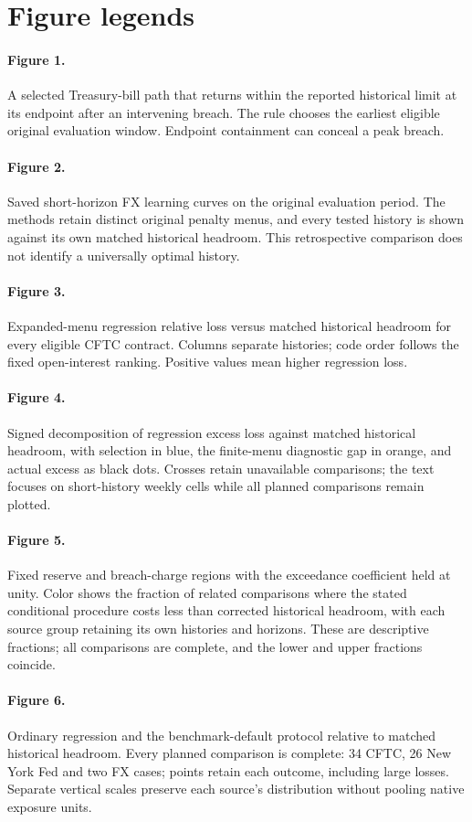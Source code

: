 \section*{Figure legends}
\paragraph{Figure 1.} A selected Treasury-bill path that returns within the reported historical limit at its endpoint after an intervening breach. The rule chooses the earliest eligible original evaluation window. Endpoint containment can conceal a peak breach.

\paragraph{Figure 2.} Saved short-horizon FX learning curves on the original evaluation period. The methods retain distinct original penalty menus, and every tested history is shown against its own matched historical headroom. This retrospective comparison does not identify a universally optimal history.

\paragraph{Figure 3.} Expanded-menu regression relative loss versus matched historical headroom for every eligible CFTC contract. Columns separate histories; code order follows the fixed open-interest ranking. Positive values mean higher regression loss.

\paragraph{Figure 4.} Signed decomposition of regression excess loss against matched historical headroom, with selection in blue, the finite-menu diagnostic gap in orange, and actual excess as black dots. Crosses retain unavailable comparisons; the text focuses on short-history weekly cells while all planned comparisons remain plotted.

\paragraph{Figure 5.} Fixed reserve and breach-charge regions with the exceedance coefficient held at unity. Color shows the fraction of related comparisons where the stated conditional procedure costs less than corrected historical headroom, with each source group retaining its own histories and horizons. These are descriptive fractions; all comparisons are complete, and the lower and upper fractions coincide.

\paragraph{Figure 6.} Ordinary regression and the benchmark-default protocol relative to matched historical headroom. Every planned comparison is complete: 34 CFTC, 26 New York Fed and two FX cases; points retain each outcome, including large losses. Separate vertical scales preserve each source's distribution without pooling native exposure units.
